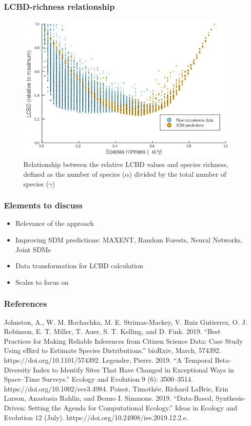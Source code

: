 \documentclass[10pt]{beamer}
\begin{document}
\begin{frame}
  \frametitle{LCBD-richness relationship}
  \begin{figure}
    \centering
    \includegraphics[scale=0.4]{fig/06_cmb_relation-oneplot.png}
    \caption{Relationship between the relative LCBD values and species richness, defined as the number of species ($\alpha$) divided by the total number of species ($\gamma$)}
  \end{figure}
\end{frame}

\begin{frame}
  \frametitle{Elements to discuss}
  \begin{itemize}
    \item Relevance of the approach
    \item Improving SDM predictions: MAXENT, Random Forests, Neural Networks, Joint SDMs
    \item Data transformation for LCBD calculation
    \item Scales to focus on
  \end{itemize}
\end{frame}

\begin{frame}
  \frametitle{References}
  Johnston, A., W. M. Hochachka, M. E. Strimas-Mackey, V. Ruiz Gutierrez, O. J. Robinson, E. T. Miller, T. Auer, S. T. Kelling, and D. Fink. 2019. “Best Practices for Making Reliable Inferences from Citizen Science Data: Case Study Using eBird to Estimate Species Distributions.” bioRxiv, March, 574392. https://doi.org/10.1101/574392.
  \vfill
  Legendre, Pierre. 2019. “A Temporal Beta-Diversity Index to Identify Sites That Have Changed in Exceptional Ways in Space–Time Surveys.” Ecology and Evolution 9 (6): 3500–3514. https://doi.org/10.1002/ece3.4984.
  \vfill
  Poisot, Timothée, Richard LaBrie, Erin Larson, Anastasia Rahlin, and Benno I. Simmons. 2019. “Data-Based, Synthesis-Driven: Setting the Agenda for Computational Ecology.” Ideas in Ecology and Evolution 12 (July). https://doi.org/10.24908/iee.2019.12.2.e.
\end{frame}
\end{document}
